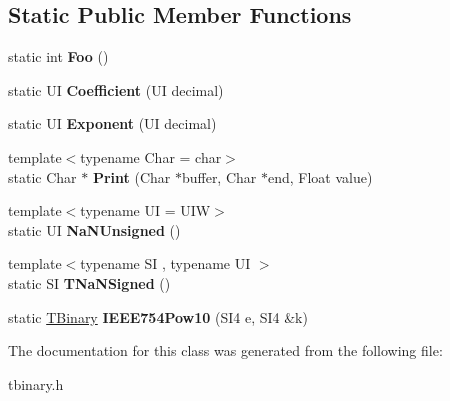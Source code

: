 \subsection*{Static Public Member Functions}
\begin{DoxyCompactItemize}
\item 
\mbox{\label{class___1_1_t_binary_a5381e4c8503392d8b67f1d508015885d}} 
static int {\bfseries Foo} ()
\item 
\mbox{\label{class___1_1_t_binary_a01666dd15a7d07d967d284539e454c36}} 
static UI {\bfseries Coefficient} (UI decimal)
\item 
\mbox{\label{class___1_1_t_binary_a0bfe64689496f819502cb921aa73facf}} 
static UI {\bfseries Exponent} (UI decimal)
\item 
\mbox{\label{class___1_1_t_binary_afaa6d73364479f2a85260196f37da5e0}} 
{\footnotesize template$<$typename Char  = char$>$ }\\static Char $\ast$ {\bfseries Print} (Char $\ast$buffer, Char $\ast$end, Float value)
\item 
\mbox{\label{class___1_1_t_binary_a600b913209ca4b431719fa5c236edf12}} 
{\footnotesize template$<$typename UI  = U\+IW$>$ }\\static UI {\bfseries Na\+N\+Unsigned} ()
\item 
\mbox{\label{class___1_1_t_binary_ac639e4f36586dfab6817a0129f319e12}} 
{\footnotesize template$<$typename SI , typename UI $>$ }\\static SI {\bfseries T\+Na\+N\+Signed} ()
\item 
\mbox{\label{class___1_1_t_binary_a6560a784914abf79600196c975df0d95}} 
static \mbox{\hyperlink{class___1_1_t_binary}{T\+Binary}} {\bfseries I\+E\+E\+E754\+Pow10} (S\+I4 e, S\+I4 \&k)
\end{DoxyCompactItemize}


The documentation for this class was generated from the following file\+:\begin{DoxyCompactItemize}
\item 
tbinary.\+h\end{DoxyCompactItemize}
